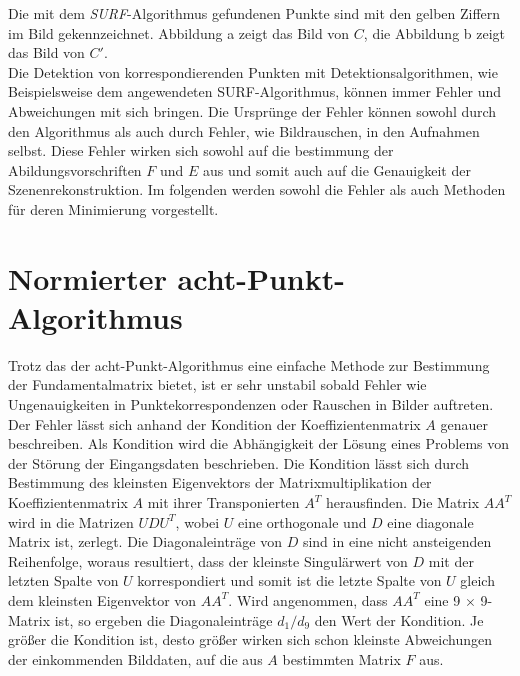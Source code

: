 Die mit dem \textit{SURF}-Algorithmus gefundenen Punkte sind mit den gelben Ziffern im Bild gekennzeichnet. Abbildung a zeigt das Bild von $C$, die Abbildung b zeigt das Bild von $C'$.\\

Die Detektion von korrespondierenden Punkten mit Detektionsalgorithmen, wie Beispielsweise dem angewendeten SURF-Algorithmus, können immer Fehler und Abweichungen mit sich bringen. Die Ursprünge der Fehler können sowohl durch den Algorithmus als auch durch Fehler, wie Bildrauschen, in den Aufnahmen selbst. Diese Fehler wirken sich sowohl auf die bestimmung der Abildungsvorschriften $F$ und $E$ aus und somit auch auf die Genauigkeit der Szenenrekonstruktion\cite{HZ}. Im folgenden werden sowohl die Fehler als auch Methoden für deren Minimierung vorgestellt.

\section{Normierter acht-Punkt-Algorithmus}

Trotz das der acht-Punkt-Algorithmus eine einfache Methode zur Bestimmung der Fundamentalmatrix bietet, ist er sehr unstabil sobald Fehler wie Ungenauigkeiten in Punktekorrespondenzen oder Rauschen in Bilder auftreten\cite{HZ,Brooks}.\\

Der Fehler lässt sich anhand der Kondition der Koeffizientenmatrix $A$ genauer beschreiben. Als Kondition wird die Abhängigkeit der Lösung eines Problems von der Störung der Eingangsdaten beschrieben\cite{HZ8,ConditionNumber,Manocha}. Die Kondition lässt sich durch Bestimmung des kleinsten Eigenvektors der Matrixmultiplikation der Koeffizientenmatrix $A$ mit ihrer Transponierten $A^T$ herausfinden. Die Matrix $AA^T$ wird in die Matrizen $UDU^T$, wobei $U$ eine orthogonale und $D$ eine diagonale Matrix ist, zerlegt. Die Diagonaleinträge von $D$ sind in eine nicht ansteigenden Reihenfolge, woraus resultiert, dass der kleinste Singulärwert von $D$ mit der letzten Spalte von $U$ korrespondiert und somit ist die letzte Spalte von $U$ gleich dem kleinsten Eigenvektor von $AA^T$\cite{HZ8,ConditionNumber}. Wird angenommen, dass $AA^T$ eine 9 $\times$ 9- Matrix ist, so ergeben die Diagonaleinträge $d_1/d_9$ den Wert der Kondition. Je größer die Kondition ist, desto größer wirken sich schon kleinste Abweichungen der einkommenden Bilddaten, auf die aus $A$ bestimmten Matrix $F$ aus.\\

